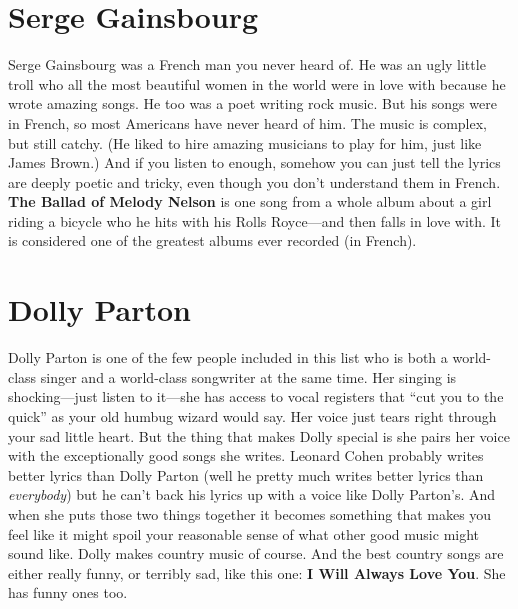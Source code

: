\documentclass[letterpaper,single]{article}
\begin{document}
\section{Serge Gainsbourg}
Serge Gainsbourg was a French man you never heard of. He was an ugly
little troll who all the most beautiful women in the world were in
love with because he wrote amazing songs. He too was a poet writing
rock music. But his songs were in French, so most Americans have never
heard of him. The music is complex, but still catchy. (He liked to hire
amazing musicians to play for him, just like James Brown.) And if you
listen to enough, somehow you can just tell the lyrics are deeply poetic
and tricky, even though you don't understand them in French. \textbf{The
Ballad of Melody Nelson} is one song from a whole album about a girl
riding a bicycle who he hits with his Rolls Royce---and then falls in
love with. It is considered one of the greatest albums ever recorded (in
French).

\section{Dolly Parton}
Dolly Parton is one of the few people included in this list who is
both a world-class singer and a world-class songwriter at the same
time. Her singing is shocking---just listen to it---she has access
to vocal registers that ``cut you to the quick'' as your old humbug
wizard would say. Her voice just tears right through your sad little
heart. But the thing that makes Dolly special is she pairs her voice
with the exceptionally good songs she writes. Leonard Cohen probably
writes better lyrics than Dolly Parton (well he pretty much writes
better lyrics than \emph{everybody}) but he can't back his lyrics up
with a voice like Dolly Parton's. And when she puts those two things
together it becomes something that makes you feel like it might spoil
your reasonable sense of what other good music might sound like. Dolly
makes country music of course. And the best country songs are either
really funny, or terribly sad, like this one: \textbf{I Will Always Love
You}. She has funny ones too.
\end{document}
